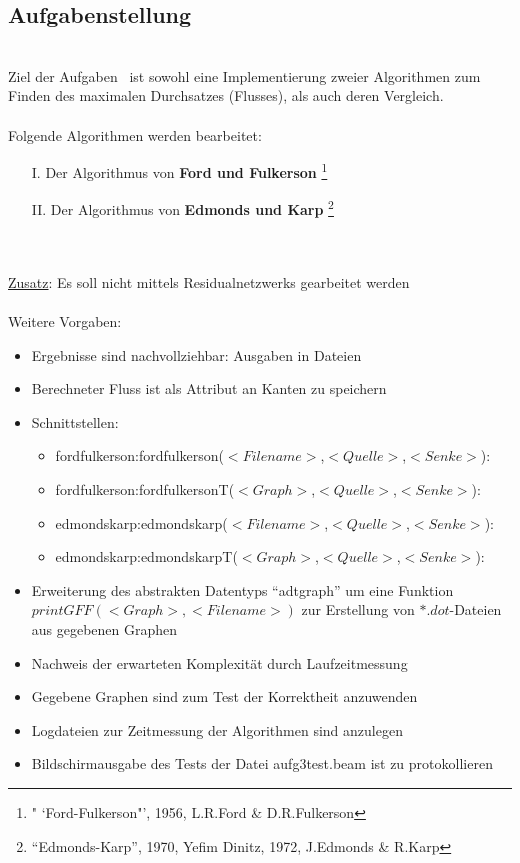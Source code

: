 \documentclass[11pt]{article}
\begin{document}
\subsection{Aufgabenstellung}\\
Ziel der Aufgaben~\cite{gkapub} ist sowohl eine Implementierung zweier Algorithmen zum Finden des maximalen Durchsatzes (Flusses), als auch deren Vergleich.\\~\\
Folgende Algorithmen werden bearbeitet:
\begin{itemize}
\item[I.] Der Algorithmus von \textbf{Ford und Fulkerson} \footnote[1]{" `Ford-Fulkerson"', 1956, L.R.Ford \& D.R.Fulkerson}
\item[II.] Der Algorithmus von \textbf{Edmonds und Karp} \footnote[2]{"`Edmonds-Karp"', 1970, Yefim Dinitz, 1972, J.Edmonds \& R.Karp}
\end{itemize}\\~\\
\underline{Zusatz}: Es soll nicht mittels Residualnetzwerks gearbeitet werden\\~\\
Weitere Vorgaben:
\begin{itemize}
\item Ergebnisse sind nachvollziehbar: Ausgaben in Dateien
\item Berechneter Fluss ist als Attribut an Kanten zu speichern
\item Schnittstellen:
\begin{itemize}
\item fordfulkerson:fordfulkerson($<Filename>$,$<Quelle>$,$<Senke>$):\\ 
\item fordfulkerson:fordfulkersonT($<Graph>$,$<Quelle>$,$<Senke>$):\\ 
\item edmondskarp:edmondskarp($<Filename>$,$<Quelle>$,$<Senke>$):\\ 
\item edmondskarp:edmondskarpT($<Graph>$,$<Quelle>$,$<Senke>$):\\ 
\end{itemize}
\item Erweiterung des abstrakten Datentyps "`adtgraph"' um eine Funktion \newline $printGFF(<Graph>,<Filename>)$ zur Erstellung von $*.dot$-Dateien aus gegebenen Graphen
\item Nachweis der erwarteten Komplexit\"at durch Laufzeitmessung
\item Gegebene Graphen sind zum Test der Korrektheit anzuwenden
\item Logdateien zur Zeitmessung der Algorithmen sind anzulegen
\item Bildschirmausgabe des Tests der Datei aufg3test.beam ist zu protokollieren
\end{itemize}
\end{document}
